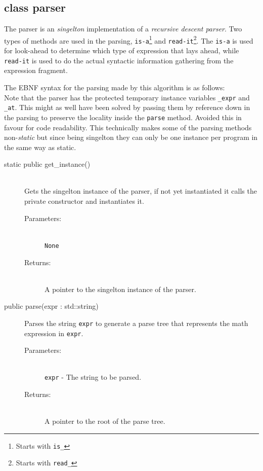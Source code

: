 \documentclass[a4paper,11pt]{kth-mag}
\begin{document}
\subsection{class parser}
The parser is an \emph{singelton} implementation of a \emph{recursive descent parser}. Two
types of methods are used in the parsing, \texttt{is-a}\footnote{Starts with
\texttt{is\_}} and \texttt{read-it}\footnote{Starts with \texttt{read\_}}.
The \texttt{is-a} is used for look-ahead to determine which type of expression
that lays ahead, while \texttt{read-it} is used to do the actual syntactic 
information gathering from the expression fragment.

The EBNF syntax for the parsing made by this algorithm is as follows:\\


Note that the parser has the protected temporary instance variables \texttt{\_expr} and
\texttt{\_at}. This might as well have been solved by passing them by reference down in the
parsing to preserve the locality inside the \texttt{parse} method. Avoided this
in favour for code readability. This technically makes some of the parsing 
methods non-\emph{static} but since being singelton they can only be one 
instance per program in the same way as static.

\begin{description}
    \item[static public get\_instance()]~\\
    Gets the singelton instance of the parser, if not yet instantiated it calls
    the private constructor and instantiates it.
    \begin{description}
        \item[Parameters:]~\\
            \verb+None+
        \item[Returns:]~\\
            A pointer to the singelton instance of the parser.
    \end{description}
\end{description}

\begin{description}
    \item[public parse(expr : std::string)] Parses the string \texttt{expr} to
    generate a parse tree that represents the math expression in \texttt{expr}.
    \begin{description}
        \item[Parameters:]~\\
            \verb+expr+ - The string to be parsed.
        \item[Returns:]~\\
            A pointer to the root of the parse tree.
    \end{description}
\end{description}
\end{document}
